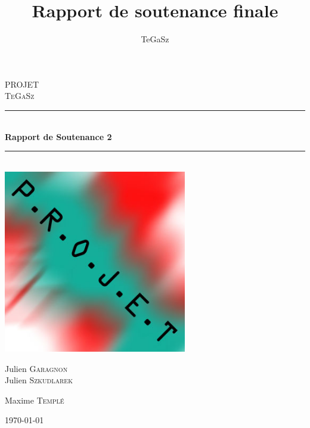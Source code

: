 \documentclass[12pt,a4paper]{report}
\title{Rapport de soutenance finale}
\date{}
\author{TeGaSz}
\newcommand{\HRule}{\rule{\linewidth}{0.5mm}}
\begin{document}
\begin{titlepage}



\begin{center}



\textsc{\LARGE PROJET}\\[1.5cm]

\textsc{\Large TeGaSz}\\[0.5cm]


\HRule \\[0.4cm]
{ \huge \bfseries Rapport de Soutenance 2}\\[0.4cm]
  
\HRule \\[1.5cm]
\includegraphics[width=0.6\textwidth]{./name.jpg}\\[1cm]  
\begin{minipage}{0.4\textwidth}
\begin{flushleft} \large
Julien \textsc{Garagnon}\\
Julien \textsc{Szkudlarek}
\end{flushleft}
\end{minipage}
\begin{minipage}{0.4\textwidth}
\begin{flushright} \large
Maxime \textsc{Templé}\\

\end{flushright}
\end{minipage}

\vfill

{\large \today}

\end{center}

\end{titlepage}
\tableofcontents
\end{document}
